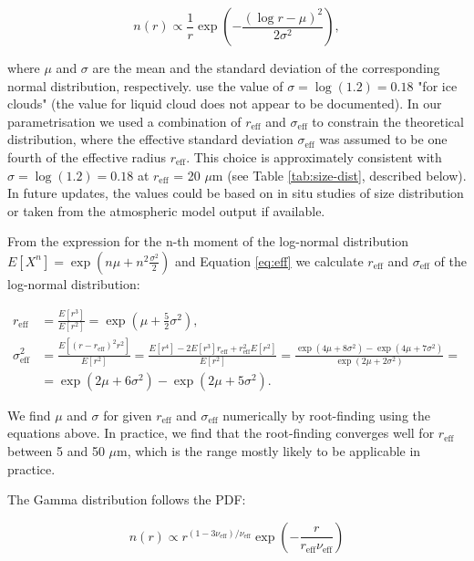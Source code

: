\begin{equation}
n(r) \propto \frac{1}{r}\exp\left(-\frac{(\log r - \mu)^2}{2\sigma^2}\right) ,
\end{equation}

where $\mu$ and $\sigma$ are the mean and the standard
deviation of the corresponding normal distribution, respectively.
\cite{chiriaco2006} use the value of $\sigma = \log(1.2) = 0.18$ "for ice clouds" (the value
for liquid cloud does not appear to be documented). In our parametrisation
we used a combination of $r_\text{eff}$ and $\sigma_\text{eff}$
to constrain the theoretical distribution, where the effective standard deviation $\sigma_\text{eff}$ was assumed to
be one fourth of the effective radius $r_\text{eff}$. This choice is approximately
consistent with $\sigma = \log(1.2) = 0.18$ at $r_\text{eff}$ = 20 $\mu$m
(see Table \ref{tab:size-dist}, described below). In future updates, the values
could be based on in situ studies of size distribution or taken from the
atmospheric model output if available.

From the expression for the n-th moment of the log-normal distribution
$E[X^n] = \exp(n\mu + n^2\frac{\sigma^2}{2})$ and Equation \eqref{eq:eff}
we calculate $r_\text{eff}$ and $\sigma_\text{eff}$ of the log-normal distribution:

\begin{align}
r_\text{eff} &= \frac{E[r^3]}{E[r^2]} = \exp(\mu + \frac{5}{2}\sigma^2) ,\\
\sigma_\text{eff}^2 &= \frac{E[(r-r_\text{eff})^2r^2]}{E[r^2]} = \frac{E[r^4] - 2E[r^3]r_\text{eff} + r_\text{eff}^2E[r^2]}{E[r^2]} = \frac{\exp(4\mu + 8\sigma^2) - \exp(4\mu + 7\sigma^2)}{\exp(2\mu + 2\sigma^2)} = \nonumber\\
&= \exp(2\mu + 6\sigma^2) - \exp(2\mu + 5\sigma^2).
\end{align}

We find $\mu$ and $\sigma$ for given $r_\text{eff}$ and $\sigma_\text{eff}$
numerically by root-finding using the equations above. In practice,
we find that the root-finding converges well for $r_\text{eff}$ between 5
and 50 $\mu$m, which is the range mostly likely to be applicable in practice.

The Gamma distribution follows the PDF:

\begin{equation}
n(r) \propto r^{(1 - 3\nu_\text{eff})/\nu_\text{eff}}\exp\left(-\frac{r}{r_\text{eff}\nu_\text{eff}}\right)
\end{equation}

